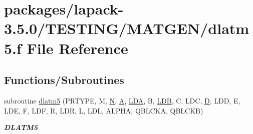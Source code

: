 \hypertarget{dlatm5_8f}{}\section{packages/lapack-\/3.5.0/\+T\+E\+S\+T\+I\+N\+G/\+M\+A\+T\+G\+E\+N/dlatm5.f File Reference}
\label{dlatm5_8f}
\subsection*{Functions/\+Subroutines}
\begin{DoxyCompactItemize}
\item 
subroutine \hyperlink{group__double__matgen_ga13322803aa9677dfd46544b0d9fadf00}{dlatm5} (P\+R\+T\+Y\+P\+E, M, \hyperlink{polmisc_8c_a0240ac851181b84ac374872dc5434ee4}{N}, \hyperlink{classA}{A}, \hyperlink{example__user_8c_ae946da542ce0db94dced19b2ecefd1aa}{L\+D\+A}, B, \hyperlink{example__user_8c_a50e90a7104df172b5a89a06c47fcca04}{L\+D\+B}, C, L\+D\+C, \hyperlink{odrpack_8h_a7dae6ea403d00f3687f24a874e67d139}{D}, L\+D\+D, E, L\+D\+E, F, L\+D\+F, R, L\+D\+R, L, L\+D\+L, A\+L\+P\+H\+A, Q\+B\+L\+C\+K\+A, Q\+B\+L\+C\+K\+B)
\begin{DoxyCompactList}\small\item\em {\bfseries D\+L\+A\+T\+M5} \end{DoxyCompactList}\end{DoxyCompactItemize}
